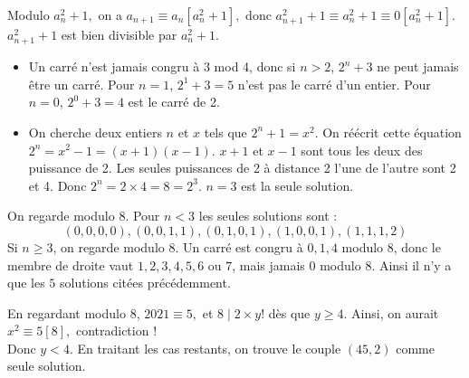 \begin{sol}
Modulo $a_n^2+1,$ on a $a_{n+1}\equiv a_n[a_n^2+1],$ donc $a_{n+1}^2+1\equiv a_n^2+1\equiv 0[a_n^2+1]$. $a_{n+1}^2+1$ est bien divisible par $a_n^2+1$.
\end{sol}


\begin{sol}
\begin{itemize}
\item Un carré n’est jamais congru à 3 mod 4, donc si $n > 2$, $2^n + 3$ ne peut jamais être un carré. Pour $n = 1$, $2^1 + 3 = 5$ n’est pas le carré d’un entier. Pour $n = 0$, $2^0 + 3 = 4$ est le carré de 2.
\item On cherche deux entiers $n$ et $x$ tels que $2^n + 1 = x^2$. On réécrit cette équation $2^n =x^2-1 = (x + 1)(x - 1)$. $x + 1$ et $x - 1$ sont tous les deux des puissance de 2. Les seules puissances de 2 à distance 2 l’une de l’autre sont 2 et 4. Donc $2^n = 2 \times 4 = 8 = 2^3$. $n = 3$ est la seule solution.
\end{itemize}
\end{sol}


\begin{sol}
On regarde modulo $8$. Pour $n<3$ les seules solutions sont :
$$(0,0,0,0),(0,0,1,1),(0,1,0,1),(1,0,0,1),(1,1,1,2)$$
Si $n\geq 3$, on regarde modulo $8$. Un carré est congru à $0,1,4$ modulo $8$, donc le membre de droite vaut $1,2,3,4,5,6$ ou $7$, mais jamais $0$ modulo $8$. Ainsi il n'y a que les $5$ solutions citées précédemment.
\end{sol}


\begin{sol}
En regardant modulo $8$, $2021\equiv 5,$ et $8\mid 2\times y!$ dès que $y\ge 4.$ Ainsi, on aurait $x^2\equiv 5[8],$ contradiction !\\
Donc $y<4$. En traitant les cas restants, on trouve le couple $(45,2)$ comme seule solution.
\end{sol}





